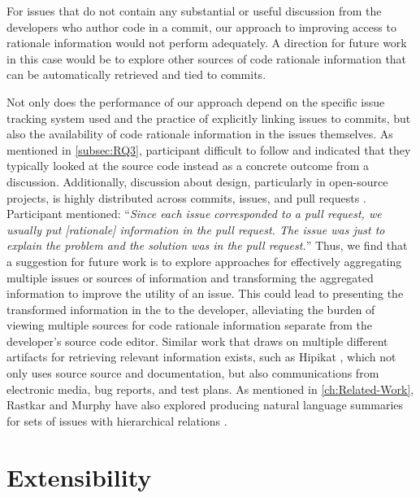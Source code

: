 For issues that do not contain any substantial or useful discussion from
the developers who author code in a commit,
our approach to improving access to rationale information would not perform adequately.
A direction for future work in this case would be to explore other sources of
code rationale information that can be automatically retrieved and tied to commits.

Not only does the performance of our approach depend on the specific
issue tracking system used and the practice of explicitly linking issues to commits,
but also the availability of code rationale information in the issues themselves.
As mentioned in \autoref{subsec:RQ3}, participant   difficult to 
follow and indicated that they typically looked at the source code instead
as a concrete outcome from a discussion.
Additionally, discussion about design, particularly in open-source projects,
is highly distributed across commits, issues, and pull requests \cite{brunet_design_2014}.
Participant  mentioned:
``\textit{Since each issue corresponded to a pull request, we usually put [rationale] information in the pull request. 
The issue was just to explain the problem and the solution was in the pull request.}''
Thus, we find that a suggestion for future work is to explore approaches for effectively aggregating multiple issues
or sources of information and transforming the aggregated information to improve the utility of an issue. 
This could lead to presenting the transformed information in the  to the developer,
alleviating the burden of viewing multiple sources for code rationale information separate from the developer's
source code editor.
Similar work that draws on multiple different artifacts for retrieving relevant information exists,
such as Hipikat \cite{cubranic_hipikat_2005}, which not only uses source source and documentation, 
but also communications from electronic media, bug reports, and test plans.
As mentioned in \autoref{ch:Related-Work}, Rastkar and Murphy have also explored
producing natural language summaries for sets of issues with hierarchical relations \cite{rastkar_why_2013}.


\section{Extensibility}

